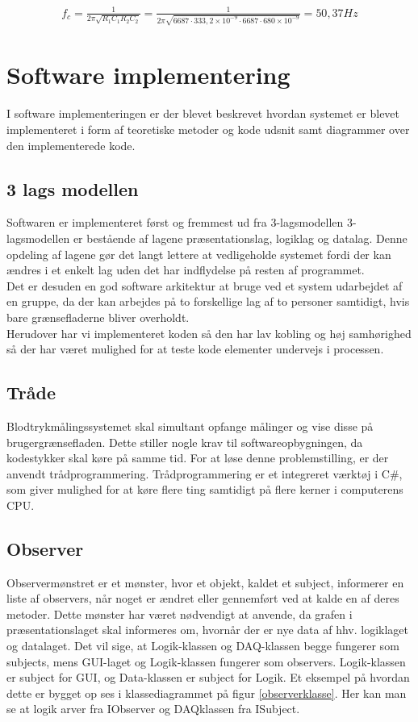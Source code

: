 \begin{align}
f_{c} = \frac{1}{2\pi \sqrt{R_{1}C_{1}R_{2}C_{2}}} = \frac{1}{2\pi \sqrt{6687 \cdot 333,2\times 10^{-9} \cdot 6687 \cdot 680\times 10^{-9}}} = 50,37 Hz
	\label{cutoff}
\end{align}

\section{Software implementering}
I software implementeringen er der blevet beskrevet hvordan systemet er blevet implementeret i form af teoretiske metoder og kode udsnit samt diagrammer over den implementerede kode.
\subsection{3 lags modellen}
Softwaren er implementeret først og fremmest ud fra 3-lagsmodellen 3-lagsmodellen er bestående af lagene præsentationslag, logiklag og datalag. Denne opdeling af lagene gør det langt lettere at vedligeholde systemet fordi der kan ændres i et enkelt lag uden det har indflydelse på resten af programmet.\\ 
Det er desuden en god software arkitektur at bruge ved et system udarbejdet af en gruppe, da der kan arbejdes på to forskellige lag af to personer samtidigt, hvis bare grænsefladerne bliver overholdt.\\
Herudover har vi implementeret koden så den har lav kobling og høj samhørighed så der har været mulighed for at teste kode elementer undervejs i processen. 

\subsection{Tråde}
Blodtrykmålingssystemet skal simultant opfange målinger og vise disse på brugergrænsefladen. Dette stiller nogle krav til softwareopbygningen, da kodestykker skal køre på samme tid. For at løse denne problemstilling, er der anvendt trådprogrammering. Trådprogrammering er et integreret værktøj i C\#, som giver mulighed for at køre flere ting samtidigt på flere kerner i computerens CPU.\\

\subsection{Observer}
Observermønstret er et mønster, hvor et objekt, kaldet et subject, informerer en liste af observers, når noget er ændret eller gennemført ved at kalde en af deres metoder. Dette mønster har været nødvendigt at anvende, da grafen i præsentationslaget skal informeres om, hvornår der er nye data af hhv. logiklaget og datalaget. Det vil sige, at Logik-klassen og DAQ-klassen begge fungerer som subjects, mens GUI-laget og Logik-klassen fungerer som observers. Logik-klassen er subject for GUI, og Data-klassen er subject for Logik. Et eksempel på hvordan dette er bygget op ses i klassediagrammet på figur \ref{observerklasse}. Her kan man se at logik arver fra IObserver og DAQklassen fra ISubject.

